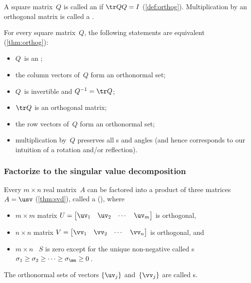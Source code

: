 \begin{itemize}
\itemhi A square matrix~\(Q\) is called an  if \(\tr QQ=I\) (\cref{def:orthog}).
Multiplication by an orthogonal matrix is called a .

\itemme For every square matrix~\(Q\),  the following statements are equivalent (\cref{thm:orthog}):
\begin{itemize}
\item \(Q\)~is an ;
\item the {column vector}s of~\(Q\) form an {orthonormal set}; 
\item \(Q\)~is {invertible} and \(Q^{-1}=\tr Q\);
\item \(\tr Q\) is an {orthogonal matrix};
\item the {row vector}s of~\(Q\) form an {orthonormal set};
\item multiplication by~\(Q\) preserves all s and angles (and hence corresponds to our intuition of a {rotation and/or reflection}).
\end{itemize}







\subsubsection{Factorize to the singular value decomposition}

\itemhi Every $m\times n$ real matrix~$A$ can be factored into a product of three matrices \(A=\usv\) (\cref{thm:svd}),
called a  (\svd), where
\begin{itemize}
		\item $m\times m$ matrix $U=\begin{bmatrix} \uv _1 &\uv_2&\cdots&\uv _m \end{bmatrix}$ is orthogonal, 
		\item $n\times n$ matrix $V=\begin{bmatrix} \vv_1 &\vv_2&\cdots&\vv_n \end{bmatrix}$ is orthogonal, and      
        \item  $m\times n$ ~$S$ is zero except for the unique non-negative  called s
$\sigma_1\geq \sigma_2 \geq \cdots \geq \sigma_{\mn}\geq 0$\,.
\end{itemize}
The orthonormal sets of vectors \(\{\uv_j\}\) and~\(\{\vv_j\}\) are called s.


\end{itemize}
